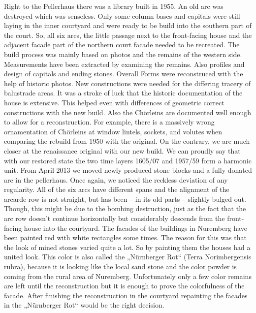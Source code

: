 Right to the Pellerhaus there was a library built in 1955. An old arc was destroyed which was senseless. Only some column bases and capitals were still laying in the inner courtyard and were ready to be build into the southern part of the court. So, all six arcs, the little passage next to the front-facing house and the adjacent facade part of the northern court facade needed to be recreated.
The build process was mainly based on photos and the remains of the western side. Measurements have been extracted by examining the remains. Also profiles and design of capitals and ending stones. Overall Forms were reconstruced with the help of historic photos. New constructions were needed for the differing tracery of balustrade areas. It was a stroke of luck that the historic documentation of the house is extensive. This helped even with differences of geometric correct constructions with the new build. Also the Chörleins are documented well enough to allow for a reconstruction. For example, there is a massively wrong ornamentation of Chörleins at window lintels, sockets, and volutes when comparing the rebuild from 1950 with the original. On the contrary, we are much closer at the renaissance original with our new build.
We can proudly say that with our restored state the two time layers 1605/07 and 1957/59 form a harmonic unit.
From April 2013 we moved newly produced stone blocks and a fully donated arc in the pellerhaus. Once again, we noticed the reckless deviation of any regularity. All of the six arcs have different spans and the alignment of the arcarde row is not straight, but has been – in its old parts – slightly bulged out. Though, this might be due to the bombing destruction, just as the fact that the arc row
doesn't continue horizontally but considerably descends from the front-facing house into the courtyard.
The facades of the buildings in Nuremberg have been painted red with white rectangles some times. The reason for this was that the look of mined stones varied quite a lot. So by painting them the houses had a united look. This color is also called the „Nürnberger Rot“ (Terra Norimbergensis rubra), because it is looking like the local sand stone and the color powder is coming from the rural area of Nuremberg. Unfortunately only a few color remains are left until the reconstruction but it is enough to prove the colorfulness of the facade. After finishing the reconstruction in the courtyard repainting the facades in the „Nürnberger Rot“ would be the right decision.\parencite{afPellerhausMagazin03} \\


